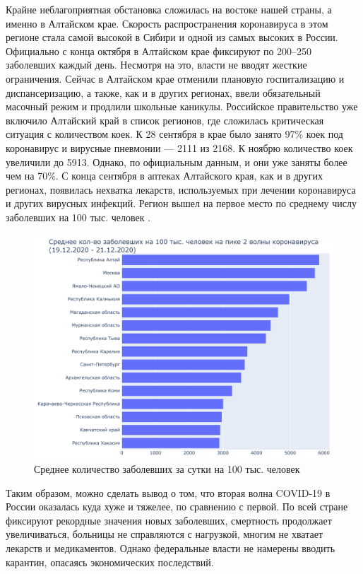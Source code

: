 \documentclass[a4paper, 12pt]{extarticle}
\begin{document}
Крайне неблагоприятная обстановка сложилась на востоке нашей страны, а именно в Алтайском крае. Скорость распространения коронавируса в этом регионе стала самой высокой в Сибири и одной из самых высоких в России. Официально с конца октября в Алтайском крае фиксируют по 200–250 заболевших каждый день. Несмотря на это, власти не вводят жесткие ограничения. Сейчас в Алтайском крае отменили плановую госпитализацию и диспансеризацию, а также, как и в других регионах, ввели обязательный масочный режим и продлили школьные каникулы. Российское правительство уже включило Алтайский край в список регионов, где сложилась критическая ситуация с количеством коек. К 28 сентября в крае было занято 97\% коек под коронавирус и вирусные пневмонии — 2111 из 2168. К ноябрю количество коек увеличили до 5913. Однако, по официальным данным, и они уже заняты более чем на 70\%. С конца сентября в аптеках Алтайского края, как и в других регионах, появилась нехватка лекарств, используемых при лечении коронавируса и других вирусных инфекций. Регион вышел на первое место по среднему числу заболевших на 100 тыс. человек .

\begin{figure}[h]
    \centering
    \includegraphics[scale=0.6]{../plots/6total_confirmed_per_100k_bar_plot_2wave.pdf}
    \caption{Среднее количество заболевших за сутки на 100 тыс. человек}
    \label{fig:average_confirmed_per_100k_2wave}
\end{figure}

Таким образом, можно сделать вывод о том, что вторая волна COVID-19 в России оказалась куда хуже и тяжелее, по сравнению с первой. По всей стране фиксируют рекордные значения новых заболевших, смертность продолжает увеличиваться, больницы не справляются с нагрузкой, многим не хватает лекарств и медикаментов. Однако федеральные власти не намерены вводить карантин, опасаясь экономических последствий.
\newpage

{}

\end{document}
